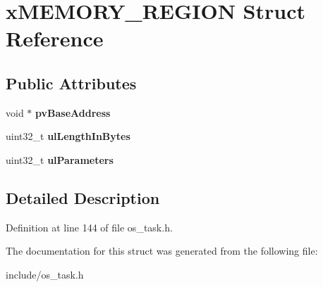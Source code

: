 \hypertarget{structxMEMORY__REGION}{}\section{x\+M\+E\+M\+O\+R\+Y\+\_\+\+R\+E\+G\+I\+ON Struct Reference}
\label{structxMEMORY__REGION}
\subsection*{Public Attributes}
\begin{DoxyCompactItemize}
\item 
\mbox{\label{structxMEMORY__REGION_a228036bbfdbc38f170e45deadb166172}} 
void $\ast$ {\bfseries pv\+Base\+Address}
\item 
\mbox{\label{structxMEMORY__REGION_a97e59578d3c4c46270d33e7206258a65}} 
uint32\+\_\+t {\bfseries ul\+Length\+In\+Bytes}
\item 
\mbox{\label{structxMEMORY__REGION_a6ba180553e9a318f23acc5f4664934e3}} 
uint32\+\_\+t {\bfseries ul\+Parameters}
\end{DoxyCompactItemize}


\subsection{Detailed Description}


Definition at line 144 of file os\+\_\+task.\+h.



The documentation for this struct was generated from the following file\+:\begin{DoxyCompactItemize}
\item 
include/os\+\_\+task.\+h\end{DoxyCompactItemize}
